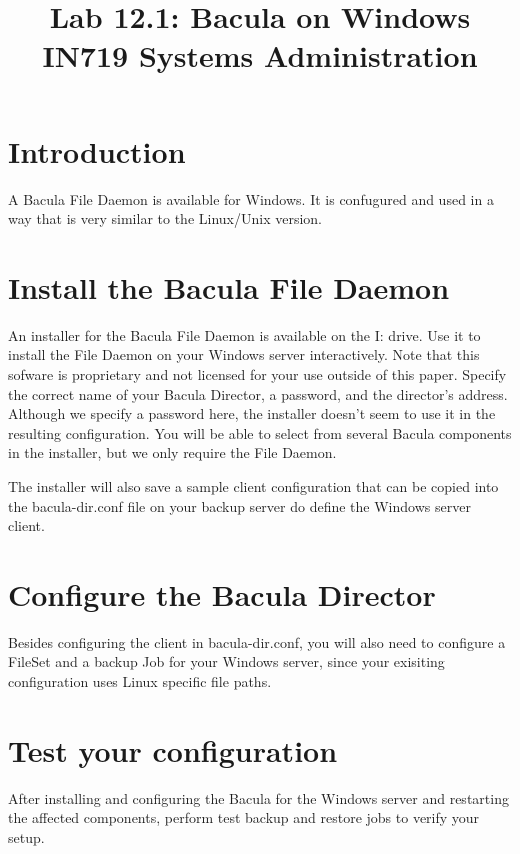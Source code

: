 \documentclass{article}   	%
\title{Lab 12.1:  Bacula on Windows\\ IN719 Systems Administration}
\date{}							%
\begin{document}
\maketitle

\section*{Introduction}
A Bacula File Daemon is available for Windows. It is confugured and used in a way that is very similar to the Linux/Unix version.

\section{Install the Bacula File Daemon}
An installer for the Bacula File Daemon is available on the I: drive.  Use it to install the File Daemon on your Windows server interactively.  Note that this sofware is proprietary and not licensed for your use outside of this paper.  Specify the correct name of your Bacula Director, a password, and the director's address.  Although we specify a password here, the installer doesn't seem to use it in the resulting configuration.  You will be able to select from several Bacula components in the installer, but we only require the File Daemon.

The installer will also save a sample client configuration that can be copied into the bacula-dir.conf file on your backup server do define the Windows server client.

\section{Configure the Bacula Director}
Besides configuring the client in bacula-dir.conf, you will also need to configure a FileSet and a backup Job for your Windows server, since your exisiting configuration uses Linux specific file paths.

\section{Test your configuration}
After installing and configuring the Bacula for the Windows server and restarting the affected components, perform test backup and restore jobs to verify your setup.
\end{document}
